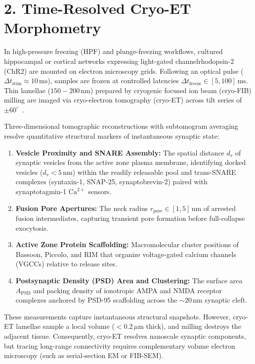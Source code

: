 \documentclass[10pt,twocolumn,letterpaper]{article}
\begin{document}
\section*{2. Time-Resolved Cryo-ET Morphometry}

In high-pressure freezing (HPF) and plunge-freezing workflows, cultured hippocampal or cortical networks expressing light-gated channelrhodopsin-2 (ChR2) are mounted on electron microscopy grids. Following an optical pulse ($\Delta t_{\text{stim}} \approx 10\,\text{ms}$), samples are frozen at controlled latencies $\Delta t_{\text{freeze}} \in [5, 100]\,\text{ms}$. Thin lamellae ($150 - 200\,\text{nm}$) prepared by cryogenic focused ion beam (cryo-FIB) milling are imaged via cryo-electron tomography (cryo-ET) across tilt series of $\pm 60^\circ$~\cite{imig2014ultrastructural}.

Three-dimensional tomographic reconstructions with subtomogram averaging resolve quantitative structural markers of instantaneous synaptic state:

\begin{enumerate}
  \item \textbf{Vesicle Proximity and SNARE Assembly:} The spatial distance $d_v$ of synaptic vesicles from the active zone plasma membrane, identifying docked vesicles ($d_v < 5\,\text{nm}$) within the readily releasable pool and trans-SNARE complexes (syntaxin-1, SNAP-25, synaptobrevin-2) paired with synaptotagmin-1 $\text{Ca}^{2+}$ sensors.
  \item \textbf{Fusion Pore Apertures:} The neck radius $r_{\text{pore}} \in [1, 5]\,\text{nm}$ of arrested fusion intermediates, capturing transient pore formation before full-collapse exocytosis.
  \item \textbf{Active Zone Protein Scaffolding:} Macromolecular cluster positions of Bassoon, Piccolo, and RIM that organize voltage-gated calcium channels (VGCCs) relative to release sites.
  \item \textbf{Postsynaptic Density (PSD) Area and Clustering:} The surface area $A_{\text{PSD}}$ and packing density of ionotropic AMPA and NMDA receptor complexes anchored by PSD-95 scaffolding across the $\sim 20\,\text{nm}$ synaptic cleft.
\end{enumerate}

These measurements capture instantaneous structural snapshots. However, cryo-ET lamellae sample a local volume ($< 0.2\,\mu\text{m}$ thick), and milling destroys the adjacent tissue. Consequently, cryo-ET resolves nanoscale synaptic components, but tracing long-range connectivity requires complementary volume electron microscopy (such as serial-section EM or FIB-SEM).
\end{document}
